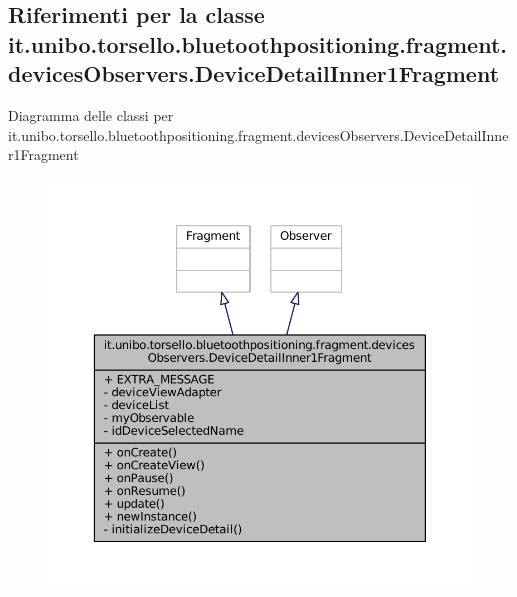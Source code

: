 \hypertarget{classit_1_1unibo_1_1torsello_1_1bluetoothpositioning_1_1fragment_1_1devicesObservers_1_1DeviceDetailInner1Fragment}{}\subsection{Riferimenti per la classe it.\+unibo.\+torsello.\+bluetoothpositioning.\+fragment.\+devices\+Observers.\+Device\+Detail\+Inner1\+Fragment}
\label{classit_1_1unibo_1_1torsello_1_1bluetoothpositioning_1_1fragment_1_1devicesObservers_1_1DeviceDetailInner1Fragment}


Diagramma delle classi per it.\+unibo.\+torsello.\+bluetoothpositioning.\+fragment.\+devices\+Observers.\+Device\+Detail\+Inner1\+Fragment
\nopagebreak
\begin{figure}[H]
\begin{center}
\leavevmode
\includegraphics[width=350pt]{classit_1_1unibo_1_1torsello_1_1bluetoothpositioning_1_1fragment_1_1devicesObservers_1_1DeviceDe8362efa0b556f228cc3338a27b7e447c}
\end{center}
\end{figure}


